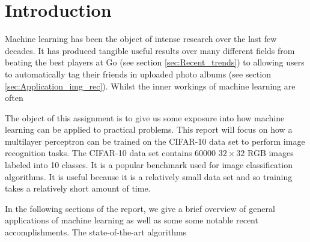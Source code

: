 \section{Introduction}
    \pagestyle{tom}

Machine learning has been the object of intense research over the last few decades. It has produced tangible useful results over many different fields from beating the best players at Go (see section \ref{sec:Recent_trends}) to allowing users to automatically tag their friends in uploaded photo albums (see section \ref{sec:Application_img_rec}). Whilst the inner workings of machine learning are often 

The object of this assignment is to give us some exposure into how machine learning can be applied to practical problems. This report will focus on how a multilayer perceptron can be trained on the CIFAR-10 data set to perform image recognition tasks. The CIFAR-10 data set contains 60000 $32\times32$ RGB images labeled into 10 classes. It is a popular benchmark used for image classification algorithms. It is useful because it is a relatively small data set and so training takes a relatively short amount of time.

In the following sections of the report, we give a brief overview of general applications of machine learning as well as some some notable recent accomplishments. The state-of-the-art algorithms
